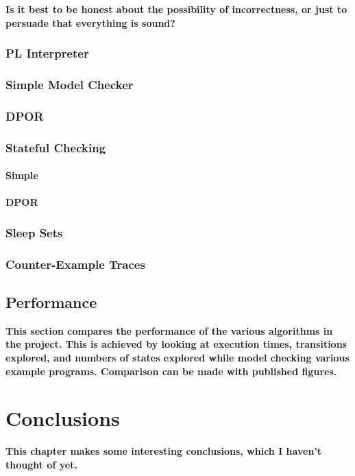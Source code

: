 \documentclass[12pt,a4paper,twoside,openright]{report}
\begin{document}
\textbf{Is it best to be honest about the
	possibility of incorrectness, or just
	to persuade that everything is sound?}

\subsection{PL Interpreter}
\subsection{Simple Model Checker}
\subsection{DPOR}
\subsection{Stateful Checking}
\subsubsection{Simple}
\subsubsection{DPOR}
\subsection{Sleep Sets}
\subsection{Counter-Example Traces}

\section{Performance}
\textbf{This section compares the
	performance of the various algorithms
	in the project. This is achieved by
	looking at execution times, transitions
	explored, and numbers of states explored
	while model checking various example
	programs. Comparison can be made with
	published figures.}

\chapter{Conclusions}

\textbf{This chapter makes some
	interesting conclusions, which I
	haven't thought of yet.}



\end{document}
